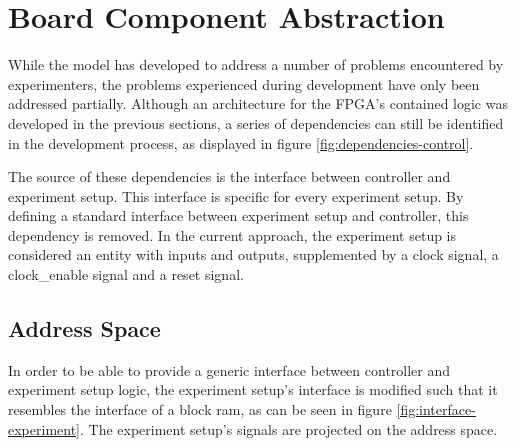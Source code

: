 \documentclass[openright]{template/uva-bachelor-thesis}
\begin{document}







\section{Board Component Abstraction}
\label{sectioncontrollerabstraction}





While the model has developed to address a number of problems encountered by experimenters, the problems experienced during development have only been addressed partially. Although an architecture for the FPGA's contained logic was developed in the previous sections, a series of dependencies can still be identified in the development process, as displayed in figure \ref{fig:dependencies-control}.  

The source of these dependencies is the interface between controller and experiment setup. This interface is specific for every experiment setup. By defining a standard interface between experiment setup and controller, this dependency is removed. In the current approach, the experiment setup is considered an entity with inputs and outputs, supplemented by a clock signal, a clock\_enable signal and a reset signal. 

\subsection{Address Space}
In order to be able to provide a generic interface between controller and experiment setup logic, the experiment setup's interface is modified such that it resembles the interface of a block ram, as can be seen in figure \ref{fig:interface-experiment}. The experiment setup's signals are projected on the address space. 
\end{document}
